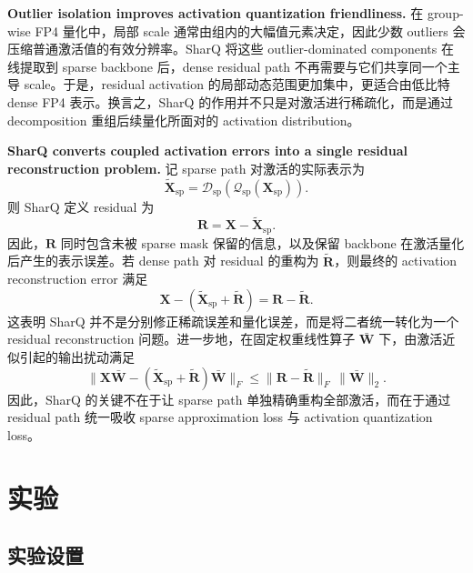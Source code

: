 \documentclass{article}
\begin{document}
\textbf{Outlier isolation improves activation quantization friendliness.}
在 group-wise FP4 量化中，局部 scale 通常由组内的大幅值元素决定，因此少数
outliers 会压缩普通激活值的有效分辨率。SharQ 将这些 outlier-dominated
components 在线提取到 sparse backbone 后，dense residual path 不再需要与它们共享同一个主导
scale。于是，residual activation 的局部动态范围更加集中，更适合由低比特 dense FP4
表示。换言之，SharQ 的作用并不只是对激活进行稀疏化，而是通过 decomposition 重组后续量化所面对的 activation
distribution。

\textbf{SharQ converts coupled activation errors into a single residual reconstruction problem.}
记 sparse path 对激活的实际表示为
\begin{equation}
  \widetilde{\mathbf{X}}_{\mathrm{sp}}
  =
  \mathcal{D}_{\mathrm{sp}}
  \left(
    \mathcal{Q}_{\mathrm{sp}}(\mathbf{X}_{\mathrm{sp}})
  \right).
\end{equation}
则 SharQ 定义 residual 为
\begin{equation}
  \mathbf{R}
  =
  \mathbf{X} - \widetilde{\mathbf{X}}_{\mathrm{sp}}.
\end{equation}
因此，$\mathbf{R}$ 同时包含未被 sparse mask 保留的信息，以及保留 backbone 在激活量化后产生的表示误差。若
dense path 对 residual 的重构为 $\widetilde{\mathbf{R}}$，则最终的 activation reconstruction
error 满足
\begin{equation}
  \mathbf{X} - (\widetilde{\mathbf{X}}_{\mathrm{sp}} + \widetilde{\mathbf{R}})
  =
  \mathbf{R} - \widetilde{\mathbf{R}}.
\end{equation}
这表明 SharQ 并不是分别修正稀疏误差和量化误差，而是将二者统一转化为一个 residual reconstruction
问题。进一步地，在固定权重线性算子 $\bar{\mathbf{W}}$ 下，由激活近似引起的输出扰动满足
\begin{equation}
  \| \mathbf{X}\bar{\mathbf{W}} - (\widetilde{\mathbf{X}}_{\mathrm{sp}} + \widetilde{\mathbf{R}})\bar{\mathbf{W}} \|_F
  \le
  \| \mathbf{R} - \widetilde{\mathbf{R}} \|_F \, \| \bar{\mathbf{W}} \|_2.
\end{equation}
因此，SharQ 的关键不在于让 sparse path 单独精确重构全部激活，而在于通过 residual path
统一吸收 sparse approximation loss 与 activation quantization loss。

\section{实验}

\subsection{实验设置}
\end{document}
